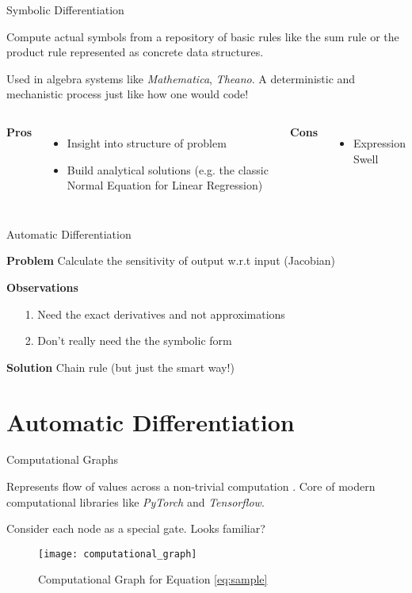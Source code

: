 \documentclass{beamer}
\begin{document}
\begin{frame}{Symbolic Differentiation}

Compute actual symbols from a repository of basic rules like the sum rule or the product
rule represented as concrete data structures.

Used in algebra systems like \textit{Mathematica}, \textit{Theano}. A deterministic and
mechanistic process just like how one would code!

\begin{columns}[T,onlytextwidth]
      \textbf{Pros}
      \begin{itemize}
		\item Insight into structure of problem
		\item Build analytical solutions (e.g. the classic Normal Equation for Linear Regression)
      \end{itemize}

      \textbf{Cons}
      \begin{itemize}
        \item Expression Swell
      \end{itemize}
\end{columns}
\end{frame}

\begin{frame}{Automatic Differentiation}

\textbf{Problem}
Calculate the sensitivity of output w.r.t input (Jacobian)

\textbf{Observations}
\begin{itemize}
\item[1.] Need the exact derivatives and not approximations
\item[2.] Don't really need the the symbolic form
\end{itemize}

\textbf{Solution} Chain rule (but just the smart way!)

\end{frame}

\section{Automatic Differentiation}

\begin{frame}{Computational Graphs}

Represents flow of values across a non-trivial computation \cite{Bauer1974}. Core of modern computational
libraries like \textit{PyTorch} and \textit{Tensorflow}.

Consider each node as a special gate. Looks familiar?

\begin{figure}[H]
\caption{Computational Graph for Equation \ref{eq:sample}}
\texttt{[image: computational\_graph]}
\centering
\label{img:computational_graph}
\end{figure}

\end{frame}
\end{document}
